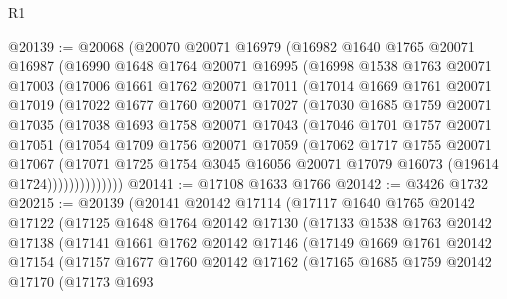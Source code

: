 \begin{lexlean}{R1}
\begin{coremodule}
@20139 := @20068
    (@20070
      @20071
      @16979
      (@16982
        @1640
        @1765
        @20071
        @16987
        (@16990
          @1648
          @1764
          @20071
          @16995
          (@16998
            @1538
            @1763
            @20071
            @17003
            (@17006
              @1661
              @1762
              @20071
              @17011
              (@17014
                @1669
                @1761
                @20071
                @17019
                (@17022
                  @1677
                  @1760
                  @20071
                  @17027
                  (@17030
                    @1685
                    @1759
                    @20071
                    @17035
                    (@17038
                      @1693
                      @1758
                      @20071
                      @17043
                      (@17046
                        @1701
                        @1757
                        @20071
                        @17051
                        (@17054
                          @1709
                          @1756
                          @20071
                          @17059
                          (@17062
                            @1717
                            @1755
                            @20071
                            @17067
                            (@17071
                              @1725
                              @1754
                              @3045
                              @16056
                              @20071
                              @17079
                              @16073
                              (@19614 @1724))))))))))))))
@20141 := @17108 @1633 @1766
@20142 := @3426 @1732
@20215 := @20139
    (@20141
      @20142
      @17114
      (@17117
        @1640
        @1765
        @20142
        @17122
        (@17125
          @1648
          @1764
          @20142
          @17130
          (@17133
            @1538
            @1763
            @20142
            @17138
            (@17141
              @1661
              @1762
              @20142
              @17146
              (@17149
                @1669
                @1761
                @20142
                @17154
                (@17157
                  @1677
                  @1760
                  @20142
                  @17162
                  (@17165
                    @1685
                    @1759
                    @20142
                    @17170
                    (@17173
                      @1693

\end{coremodule}
\end{lexlean}
